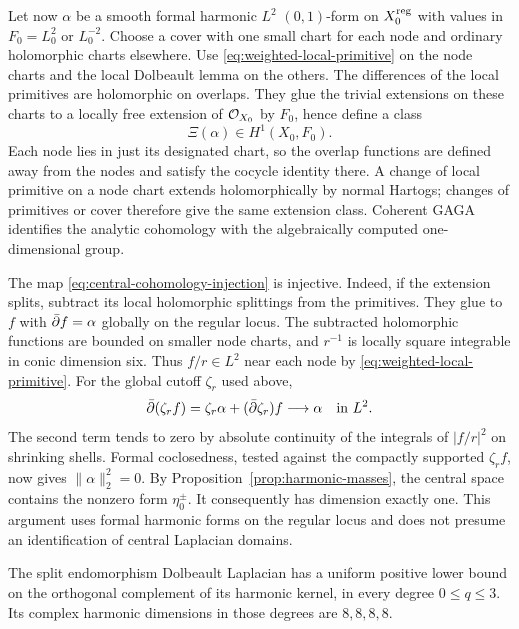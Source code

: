 Let now $\alpha$ be a smooth formal harmonic $L^2$
$(0,1)$-form on $X_0^{\rm reg}$ with values in
$F_0=L_0^2$ or $L_0^{-2}$. Choose a cover with one
small chart for each node and ordinary holomorphic
charts elsewhere. Use \eqref{eq:weighted-local-primitive}
on the node charts and the local Dolbeault lemma on the
others. The differences of the local primitives are
holomorphic on overlaps. They glue the trivial extensions
on these charts to a locally free extension of $\mathcal O_{X_0}$
by $F_0$, hence define a class
\begin{equation}\label{eq:central-cohomology-injection}
 \Xi(\alpha)\in H^1(X_0,F_0).
\end{equation}
Each node lies in just its designated chart, so the
overlap functions are defined away from the nodes and
satisfy the cocycle identity there. A change of local
primitive on a node chart extends holomorphically by
normal Hartogs; changes of primitives or cover therefore
give the same extension class. Coherent GAGA identifies
the analytic cohomology with the algebraically computed
one-dimensional group.

The map \eqref{eq:central-cohomology-injection} is injective.
Indeed, if the extension splits, subtract its local
holomorphic splittings from the primitives. They glue to
$f$ with $\bar\partial f=\alpha$ globally on the regular locus.
The subtracted holomorphic functions are bounded on smaller
node charts, and $r^{-1}$ is locally square integrable
in conic dimension six. Thus $f/r\in L^2$ near each node
by \eqref{eq:weighted-local-primitive}. For the global
cutoff $\zeta_r$ used above,
\[
 \bar\partial(\zeta_r f)=\zeta_r\alpha+(\bar\partial\zeta_r)f
                           \longrightarrow\alpha\quad\text{in }L^2.
\]
The second term tends to zero by absolute continuity of
the integrals of $|f/r|^2$ on shrinking shells.
Formal coclosedness, tested against the compactly supported
$\zeta_r f$, now gives $\|\alpha\|_2^2=0$.
By Proposition~\ref{prop:harmonic-masses}, the central
space contains the nonzero form $\eta_0^\pm$.
It consequently has dimension exactly one. This argument
uses formal harmonic forms on the regular locus and does
not presume an identification of central Laplacian domains.

\begin{proposition}\label{prop:full-dolbeault-gap}
The split endomorphism Dolbeault Laplacian has a uniform
positive lower bound on the orthogonal complement of its
harmonic kernel, in every degree $0\le q\le3$. Its complex
harmonic dimensions in those degrees are $8,8,8,8$.
\end{proposition}

